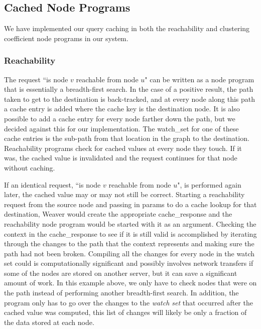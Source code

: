 \documentclass[letterpaper,twocolumn,11pt,tight]{article}
\begin{document}
\subsection{Cached Node Programs}\label{sec:cached_progs}
We have implemented our query caching in both the reachability and clustering coefficient node programs in our system.

\subsubsection{Reachability}
The request ``is node $v$ reachable from node $u$" can be written as a node program that is essentially a breadth-first search.
In the case of a positive result, the path taken to get to the destination is back-tracked, and at every node along this path a cache entry is added where the cache key is the destination node.
It is also possible to add a cache entry for every node farther down the path, but we decided against this for our implementation.
The watch\_set for one of these cache entries is the sub-path from that location in the graph to the destination. Reachability programs check for cached values at every node they touch. If it was, the cached value is invalidated and the request continues for that node without caching.

    If an identical request, ``is node $v$ reachable from node $u$", is performed again later, the cached value may or may not still be correct. Starting a reachability request from the source node and passing in params to do a cache lookup for that destination, Weaver would create the appropriate cache\_response and the reachability node program would be started with it as an argument.
    Checking the context in the cache\_response to see if it is still valid is accomplished by iterating through the changes to the path that the context represents and making sure the path had not been broken.
    Compiling all the changes for every node in the watch set could is computationally significant and possibly involves network transfers if some of the nodes are stored on another server, but it can save a significant amount of work. In this example above, we only have to check nodes that were on the path instead of performing another breadth-first search. In addition, the program only has to go over the changes to the \emph{watch set} that occurred after the cached value was computed, this list of changes will likely be only a fraction of the data stored at each node.
\end{document}
